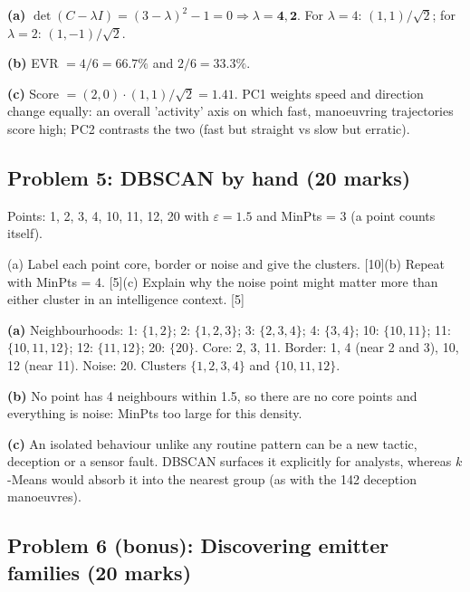 \documentclass[11pt]{article}
\begin{document}
\begin{soln}\textbf{(a)} $\det(C-\lambda I)=(3-\lambda)^2-1=0\Rightarrow\lambda=\mathbf{4},\mathbf{2}$. For $\lambda=4$: $(1,1)/\sqrt2$; for $\lambda=2$: $(1,-1)/\sqrt2$.

\textbf{(b)} EVR $=4/6=\mathbf{66.7\%}$ and $2/6=\mathbf{33.3\%}$.

\textbf{(c)} Score $=(2,0)\cdot(1,1)/\sqrt2=\mathbf{1.41}$. PC1 weights speed and direction change equally: an overall 'activity' axis on which fast, manoeuvring trajectories score high; PC2 contrasts the two (fast but straight vs slow but erratic).\end{soln}

\subsection{Problem 5: DBSCAN by hand \normalfont\small\color{GreyN}(20 marks)}

\begin{prob}Points: 1, 2, 3, 4, 10, 11, 12, 20 with $\varepsilon=1.5$ and MinPts = 3 (a point counts itself).

(a) Label each point core, border or noise and give the clusters. [10]\newline (b) Repeat with MinPts = 4. [5]\newline (c) Explain why the noise point might matter more than either cluster in an intelligence context. [5]\end{prob}

\begin{soln}\textbf{(a)} Neighbourhoods: 1: $\{1,2\}$; 2: $\{1,2,3\}$; 3: $\{2,3,4\}$; 4: $\{3,4\}$; 10: $\{10,11\}$; 11: $\{10,11,12\}$; 12: $\{11,12\}$; 20: $\{20\}$. Core: 2, 3, 11. Border: 1, 4 (near 2 and 3), 10, 12 (near 11). Noise: 20. Clusters $\{1,2,3,4\}$ and $\{10,11,12\}$.

\textbf{(b)} No point has 4 neighbours within 1.5, so there are no core points and everything is noise: MinPts too large for this density.

\textbf{(c)} An isolated behaviour unlike any routine pattern can be a new tactic, deception or a sensor fault. DBSCAN surfaces it explicitly for analysts, whereas $k$-Means would absorb it into the nearest group (as with the 142 deception manoeuvres).\end{soln}

\subsection{Problem 6 (bonus): Discovering emitter families \normalfont\small\color{GreyN}(20 marks)}
\end{document}
